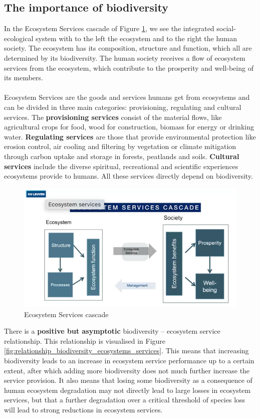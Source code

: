 \documentclass[../summary.tex]{subfiles}
\begin{document}
	\subsection{The importance of biodiversity}
	In the Ecosystem Services cascade of Figure \ref{fig:ecosystems_services_cascade}, we see the integrated social-ecological system with to the left the ecosystem and to the right the human society. The ecosystem has its composition, structure and function, which all are determined by its biodiversity. The human society receives a flow of ecosystem services from the ecosystem, which contribute to the prosperity and well-being of its members. 
	\\
	\\
	Ecosystem Services are the goods and services humans get from ecosystems and can be divided in three main categories: provisioning, regulating and cultural services. The \textbf{provisioning services} consist of the material flows, like agricultural crops for food, wood for construction, biomass for energy or drinking water. \textbf{Regulating services} are those that provide environmental protection like erosion control, air cooling and filtering by vegetation or climate mitigation through carbon uptake and storage in forests, peatlands and soils. \textbf{Cultural services} include the diverse spiritual, recreational and scientific experiences ecosystems provide to humans. All these services directly depend on biodiversity.
	\begin{figure}[htbp]
		\centering
		\includegraphics[width=1\linewidth]{images/2-ecosystem-services-cascade.png}
		\caption{Ecosystem Services cascade}
		\label{fig:ecosystems_services_cascade}
	\end{figure}
	\newpage
	There is a \textbf{positive but asymptotic} biodiversity – ecosystem service relationship. This relationship is visualised in Figure \ref{fig:relationship_biodiversity_ecosystems_services}. This means that increasing biodiversity leads to an increase in ecosystem service performance up to a certain extent, after which adding more biodiversity does not much further increase the service provision. It also means that losing some biodiversity as a consequence of human ecosystem degradation may not directly lead to large losses in ecosystem services, but that a further degradation over a critical threshold of species loss will lead to strong reductions in ecosystem services.
\end{document}
